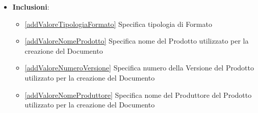 \begin{itemize}
\begin{enumerate}
                        creazione del Documento
                  \item Il sistema imposta i valori del filtro come parametri di ricerca.
            \end{enumerate}
      \item \textbf{Inclusioni}: \begin{itemize}
            \item \ref{addValoreTipologiaFormato} Specifica tipologia di Formato
            \item \ref{addValoreNomeProdotto} Specifica nome del Prodotto utilizzato per la creazione del Documento
            \item \ref{addValoreNumeroVersione} Specifica numero della Versione del Prodotto utilizzato per la creazione del Documento
            \item \ref{addValoreNomeProduttore} Specifica nome del Produttore del Prodotto utilizzato per la creazione del Documento
      \end{itemize}
\end{itemize}

